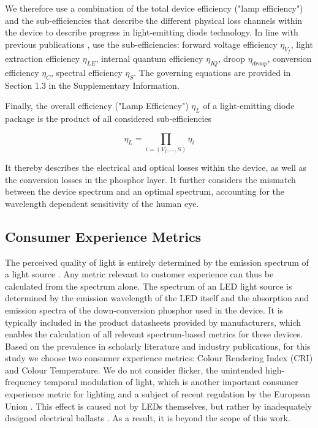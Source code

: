 \documentclass[journal=jacsat,manuscript=article]{achemso}
\begin{document}
We therefore use a combination of the total device efficiency ("lamp efficiency") and the sub-efficiencies that describe the different physical loss channels within the device to describe progress in light-emitting diode technology. In line with previous publications \cite{schubert2018light}\cite{tsao2010solid}, use the sub-efficiencies: forward voltage efficiency $\eta_{V_f}$, light extraction efficiency $\eta_{LE}$, internal quantum efficiency $\eta_{IQ}$, droop $\eta_{droop}$, conversion efficiency $\eta_{C}$, spectral efficiency $\eta_{S}$. The governing equations are provided in Section 1.3 in the Supplementary Information.

Finally, the overall efficiency ("Lamp Efficiency") $\eta_L$ of a light-emitting diode package is the product of all considered sub-efficiencies

\begin{equation}
    \eta_L = \prod_{i=(V_f, \dots, S)} \eta_i
\end{equation}

It thereby describes the electrical and optical losses within the device, as well as the conversion losses in the phosphor layer. It further considers the mismatch between the device spectrum and an optimal spectrum, accounting for the wavelength dependent sensitivity of the human eye.

\subsection{Consumer Experience Metrics}

The perceived quality of light is entirely determined by the emission spectrum of a light source \cite{ies_handbook}. Any metric relevant to customer experience can thus be calculated from the spectrum alone. The spectrum of an LED light source is determined by the emission wavelength of the LED itself and the absorption and emission spectra  of the down-conversion phosphor used in the device. It is typically included in the product datasheets provided by manufacturers, which enables the calculation of all relevant spectrum-based metrics for these devices. Based on the prevalence in scholarly literature and industry publications, for this study we choose two consumer experience metrics: Colour Rendering Index (CRI) and Colour Temperature. We do not consider flicker, the unintended high-frequency temporal modulation of light, which is another important consumer experience metric for lighting and a subject of recent regulation by the European Union \cite{weinold2020long}. This effect is caused not by LEDs themselves, but rather by inadequately designed electrical ballasts \cite{Lehman2014}. As a result, it is beyond the scope of this work. 
\end{document}
